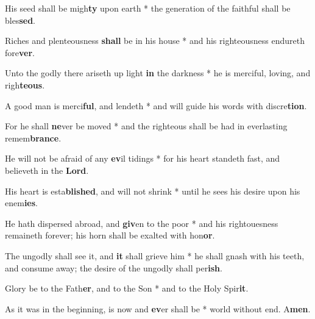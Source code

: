 \begin{multicols}{2}
	His seed shall be migh\textbf{ty} upon earth * the generation of the faithful shall be bles\textbf{sed}.
	
	Riches and plenteousness \textbf{shall} be in his house * and his righteousness endureth fore\textbf{ver}.
	
	Unto the godly there ariseth up light \textbf{in} the darkness * he is merciful, loving, and righ\textbf{teous}.
	
	A good man is merci\textbf{ful}, and lendeth * and will guide his words with discre\textbf{tion}.
	
	For he shall \textbf{ne}ver be moved * and the righteous shall be had in everlasting remem\textbf{brance}.
	
	He will not be afraid of any \textbf{ev}il tidings * for his heart standeth fast, and believeth in the \textbf{Lord}.
	
	His heart is esta\textbf{blished}, and will not shrink * until he sees his desire upon his enem\textbf{ies}.
	
	He hath dispersed abroad, and \textbf{giv}en to the poor * and his rightouesness remaineth forever; his horn shall be exalted with hon\textbf{or}.
	
	The ungodly shall see it, and \textbf{it} shall grieve him * he shall gnash with his teeth, and consume away; the desire of the ungodly shall per\textbf{ish}.
	
	Glory be to the Fath\textbf{er}, and to the Son * and to the Holy Spir\textbf{it}.
	
	As it was in the beginning, is now and \textbf{ev}er shall be * world without end. A\textbf{men}.
\end{multicols}